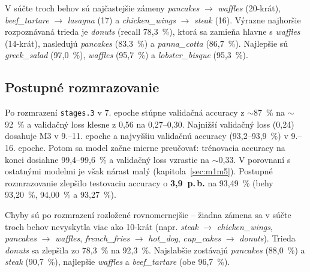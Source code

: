 
V súčte troch behov sú najčastejšie zámeny \emph{pancakes} $\rightarrow$
\emph{waffles} (20-krát), \emph{beef\_tartare} $\rightarrow$
\emph{lasagna} (17) a \emph{chicken\_wings} $\rightarrow$ \emph{steak}
(16). Výrazne najhoršie rozpoznávaná trieda je \emph{donuts} (recall
78,3~\%), ktorá sa zamieňa hlavne s \emph{waffles} (14-krát), nasledujú
\emph{pancakes} (83,3~\%) a \emph{panna\_cotta} (86,7~\%). Najlepšie sú
\emph{greek\_salad} (97,0~\%), \emph{waffles} (95,7~\%)
a \emph{lobster\_bisque} (95,3~\%).

\subsection{Postupné rozmrazovanie}



Po rozmrazení \texttt{stages.3} v 7. epoche stúpne validačná accuracy
z $\sim$87~\% na $\sim$92~\% a validačný loss klesne z 0,56 na
0,27--0,30. Najnižší validačný loss (0,24) dosahuje M3 v 9.--11. epoche
a najvyššiu validačnú accuracy (93,2--93,9~\%) v 9.--16. epoche. Potom sa
model začne mierne preučovať: trénovacia accuracy na konci dosiahne
99,4--99,6~\% a validačný loss vzrastie na $\sim$0,33. V porovnaní
s ostatnými modelmi je však nárast malý (kapitola~\ref{sec:m1m5}).
Postupné rozmrazovanie zlepšilo testovaciu accuracy o
\textbf{3,9~p.\,b.} na 93,49~\% (behy 93,20~\%, 94,00~\% a 93,27~\%).


Chyby sú po rozmrazení rozložené rovnomernejšie -- žiadna zámena sa
v súčte troch behov nevyskytla viac ako 10-krát (napr. \emph{steak}
$\rightarrow$ \emph{chicken\_wings}, \emph{pancakes} $\rightarrow$
\emph{waffles}, \emph{french\_fries} $\rightarrow$ \emph{hot\_dog},
\emph{cup\_cakes} $\rightarrow$ \emph{donuts}). Trieda \emph{donuts} sa
zlepšila zo 78,3~\% na 92,3~\%. Najslabšie zostávajú \emph{pancakes}
(88,0~\%) a \emph{steak} (90,7~\%), najlepšie \emph{waffles}
a \emph{beef\_tartare} (obe 96,7~\%).

